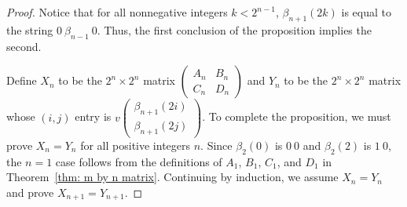 \documentclass[12pt]{article}
\theoremstyle{plain}
\theoremstyle{remark}
\theoremstyle{definition}
\theoremstyle{remark}
\theoremstyle{definition}
\begin{document}
\begin{proof}
Notice that for all nonnegative integers $k<2^{n-1}$, $\beta_{n+1}(2k)$ is equal to the string $0\ \beta_{n-1}\ 0$.  Thus, the first conclusion of the proposition implies the second.

Define $X_{n}$ to be the $2^{n}\times2^{n}$ matrix $\begin{pmatrix}A_{n} & B_{n}\\ C_{n} & D_{n} \end{pmatrix}$ and $Y_{n}$ to be the $2^{n}\times2^{n}$ matrix whose $\left(i,j\right)$ entry is $v\left(\begin{smallmatrix}\beta_{n+1}\left(2i\right)\\ \beta_{n+1}\left(2j\right) \end{smallmatrix}\right)$. To complete the proposition, we must prove $X_{n}=Y_{n}$ for all positive integers $n$. Since $\beta_{2}\left(0\right)$ is $0\ 0$ and $\beta_{2}\left(2\right)$ is $1\ 0$, the $n=1$ case follows from the definitions of $A_{1}$, $B_{1}$, $C_{1}$, and $D_{1}$ in Theorem~\ref{thm: m by n matrix}. Continuing by induction, we assume $X_{n}=Y_{n}$ and prove $X_{n+1}=Y_{n+1}$.


\end{proof}
\end{document}

